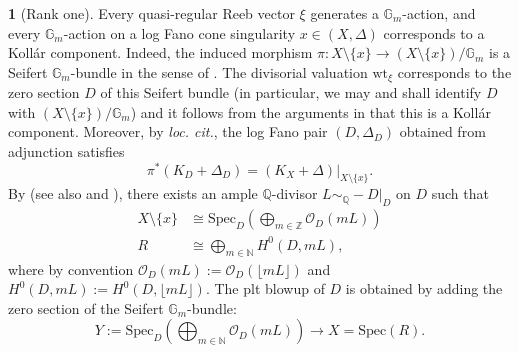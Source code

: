\documentclass[12pt]{amsart}
\theoremstyle{definition}
\newtheorem{emp}[prop]{}
\newcommand{\bQ}{\mathbb{Q}}
\newcommand{\bZ}{\mathbb{Z}}
\newcommand{\bN}{\mathbb{N}}
\newcommand{\bG}{\mathbb{G}}
\newcommand{\cO}{\mathcal{O}}
\newcommand{\Spec}{\mathrm{Spec}}
\newcommand{\wt}{\mathrm{wt}}
\numberwithin{equation}{section}
\begin{document}
\begin{emp}[Rank one]\label{para-quasi-kollar}
Every quasi-regular Reeb vector $\xi$ generates a $\bG_m$-action, and every $\bG_m$-action on a log Fano cone singularity $x\in (X,\Delta)$ corresponds to a Koll\'ar component. Indeed, the induced morphism $\pi\colon X\setminus\{x\}\to (X\setminus\{x\})/\bG_m$ is a Seifert $\bG_m$-bundle in the sense of \cite{Kol-Seifert-bundle}. The divisorial valuation $\wt_\xi$ corresponds to the zero section $D$ of this Seifert bundle (in particular, we may and shall identify $D$ with $(X\setminus\{x\})/\bG_m$) and it follows from the arguments in \cite[Section 4]{Kol-Seifert-bundle} that this is a Koll\'ar component. Moreover, by {\it loc. cit.}, the log Fano pair $(D,\Delta_D)$ obtained from adjunction satisfies 
\begin{equation} \label{eq:orbifold cone crepant pullback}
\pi^*(K_D+\Delta_D) = (K_X+\Delta)|_{X\setminus \{x\}}.
\end{equation}
By \cite[Theorem 7]{Kol-Seifert-bundle} (see also \cite[Section 2.4]{LX-Kol-comp-stab} and \cite[Proposition 2.10]{LZ-Tian-sharpness}), there exists an ample $\bQ$-divisor $L\sim_\bQ -D|_D$ on $D$ such that
\begin{align*}
X\setminus\{x\} & \cong \Spec_D \left(\bigoplus_{m\in\bZ} \cO_D(mL)\right) \\
R & \cong \bigoplus_{m\in\bN} H^0(D,mL),
\end{align*}
where by convention $\cO_D(mL):=\cO_D(\lfloor mL\rfloor)$ and $H^0(D,mL):=H^0(D,\lfloor mL\rfloor)$. The plt blowup of $D$ is obtained by adding the zero section of the Seifert $\bG_m$-bundle:
\[
Y:= \Spec_D \left(\bigoplus_{m\in\bN} \cO_D(mL)\right) \to X = \Spec (R).
\]
\end{emp}
\end{document}
